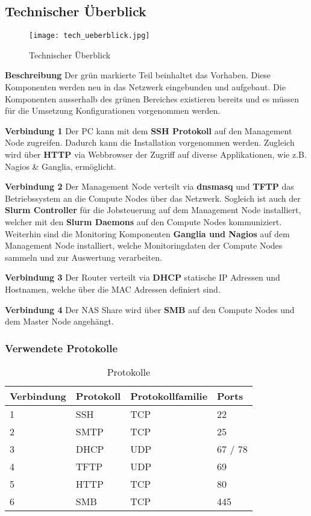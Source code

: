 \subsection{Technischer Überblick}
\begin{figure}[H]
\centering
\texttt{[image: tech\_ueberblick.jpg]}
\caption{Technischer Überblick}
\label{fig:Technischer Überblick}
\end{figure} 

\textbf{Beschreibung}\newline
Der grün markierte Teil beinhaltet das Vorhaben. Diese Komponenten werden neu in das Netzwerk eingebunden und aufgebaut. Die Komponenten ausserhalb des grünen Bereiches existieren bereits und es müssen für die Umsetzung Konfigurationen vorgenommen werden.

\textbf{Verbindung 1} \newline
Der PC kann mit dem \textbf{SSH Protokoll} auf den Management Node zugreifen. Dadurch kann die Installation vorgenommen werden. Zugleich wird über \textbf{HTTP} via Webbrowser der Zugriff auf diverse Applikationen, wie z.B. Nagios \& Ganglia, ermöglicht.

\textbf{Verbindung 2} \newline
Der Management Node verteilt via \textbf{dnsmasq} und  \textbf {TFTP} das Betriebssystem an die Compute Nodes über das Netzwerk. Sogleich ist auch der \textbf{Slurm Controller} für die Jobsteuerung auf dem Management Node installiert, welcher mit den \textbf{Slurm Daemons} auf den Compute Nodes kommuniziert. Weiterhin sind die Monitoring Komponenten \textbf{Ganglia und Nagios} auf dem Management Node installiert, welche Monitoringdaten der Compute Nodes sammeln und zur Auswertung verarbeiten.

\textbf{Verbindung 3} \newline
Der Router verteilt via \textbf{DHCP} statische IP Adressen und Hostnamen, welche über die MAC Adressen definiert sind.

\textbf{Verbindung 4} \newline
Der NAS Share wird über \textbf{SMB} auf den Compute Nodes und dem Master Node angehängt.

\subsubsection{Verwendete Protokolle}
\begin{table}[H]
\centering
\begin{tabular}{p{2cm}p{4cm}p{5cm}p{5cm}}
\hline
\rowcolor{heading} \textbf{Verbindung} & \textbf{Protokoll} & \textbf{Protokollfamilie} & \textbf{Ports} \\\hline
1 & SSH & TCP & 22 \\\hline
2 & SMTP & TCP & 25 \\\hline
3 & DHCP & UDP & 67 / 78 \\\hline
4 & TFTP & UDP & 69 \\\hline
5 & HTTP & TCP & 80 \\\hline
6 & SMB & TCP & 445 \\\hline
\end{tabular}
\caption{Protokolle}
\end{table}

